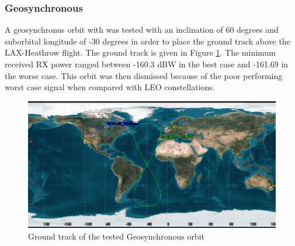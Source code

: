 \subsubsection{Geosynchronous}
A geosynchronus orbit with was tested with an inclination of 60 degrees and suborbital longitude of -30 degrees in order to place the ground track above the LAX-Heathrow flight. The ground track is given in Figure \ref{fig:geosynch}. The minimum received RX power ranged between -160.3 dBW in the best case and -161.69 in the worse case. This orbit was then dismissed because of the poor performing worst case signal when compared with LEO constellations. 

\begin{figure}[H]
	\centering
	\includegraphics[scale = 0.55]{Pictures/geosynch.png}
	
	\caption{Ground track of the tested Geosynchronous orbit}
	\label{fig:geosynch}
\end{figure} 
